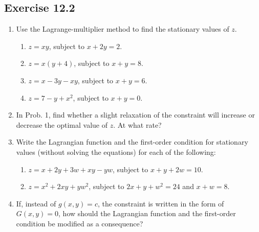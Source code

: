 \documentclass{./../../Latex/homework}
\begin{document}
\thispagestyle{plain}

\subsection*{Exercise 12.2}

\begin{enumerate}

\item Use the Lagrange-multiplier method to find the stationary values of $z$.
\begin{enumerate}
\item $z=x y$, subject to $x+2 y=2$.
\item $z=x(y+4)$, subject to $x+y=8$.
\item $z=x-3 y-x y$, subject to $x+y=6$.
\item $z=7-y+x^{2}$, subject to $x+y=0$.
\end{enumerate}

\item In Prob. 1, find whether a slight relaxation of the constraint will increase or decrease the optimal value of $z$. At what rate?

\item Write the Lagrangian function and the first-order condition for stationary values (without solving the equations) for each of the following:
\begin{enumerate}
\item $z=x+2 y+3 w+x y-y w$, subject to $x+y+2 w=10$.
\item $z=x^{2}+2 x y+y w^{2}$, subject to $2 x+y+w^{2}=24$ and $x+w=8$.
\end{enumerate}

\item If, instead of $g(x, y)=c$, the constraint is written in the form of $G(x, y)=0$, how should the Lagrangian function and the first-order condition be modified as a consequence?
\end{enumerate}
\end{document}
